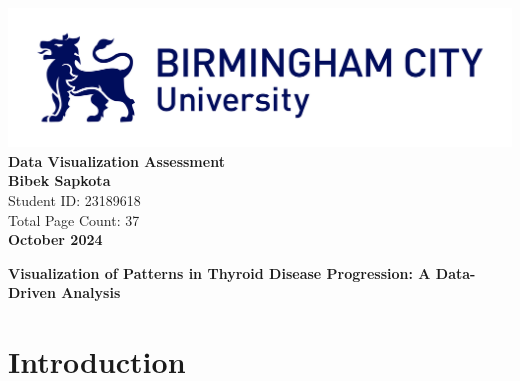\documentclass[12pt]{article}
\begin{document}
\begin{titlepage}
    \centering 
   
    \includegraphics[width=1.1\textwidth]{BCU-logo.jpg} \\[3cm] %
    
    {\Large \textbf{Data Visualization Assessment}} \\[1cm]
    
    \textbf{Bibek Sapkota} \\
    Student ID: 23189618 \\[0.2cm]

    Total Page Count: 37 \\[0.5cm]
    
    \textbf{October 2024}
    
\end{titlepage}




\newpage %
\tableofcontents %
\newpage
\listoffigures %
\newpage


\begin{center}

    \LARGE \textbf{Visualization of Patterns in Thyroid Disease Progression: A Data-Driven Analysis}
\end{center}

\vspace{0.2cm}

\section{Introduction}

\vspace{0.2cm}
\end{document}
